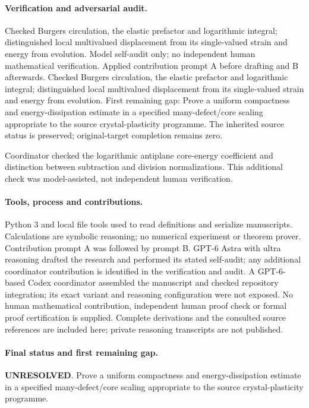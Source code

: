 \documentclass[11pt]{article}
\begin{document}
\paragraph{Verification and adversarial audit.}
Checked Burgers circulation, the elastic prefactor and logarithmic integral; distinguished local multivalued displacement from its single-valued strain and energy from evolution. Model self-audit only; no independent human mathematical verification. Applied contribution prompt A before drafting and B afterwards. Checked Burgers circulation, the elastic prefactor and logarithmic integral; distinguished local multivalued displacement from its single-valued strain and energy from evolution. First remaining gap: Prove a uniform compactness and energy-dissipation estimate in a specified many-defect/core scaling appropriate to the source crystal-plasticity programme. The inherited source status is preserved; original-target completion remains zero.

Coordinator checked the logarithmic antiplane core-energy coefficient and distinction between subtraction and division normalizations. This additional check was model-assisted, not independent human verification.

\paragraph{Tools, process and contributions.}
Python 3 and local file tools used to read definitions and serialize manuscripts. Calculations are symbolic reasoning; no numerical experiment or theorem prover. Contribution prompt A was followed by prompt B. GPT-6 Astra with ultra reasoning drafted the research and performed its stated self-audit; any additional coordinator contribution is identified in the verification and audit. A GPT-6-based Codex coordinator assembled the manuscript and checked repository integration; its exact variant and reasoning configuration were not exposed. No human mathematical contribution, independent human proof check or formal proof certification is supplied. Complete derivations and the consulted source references are included here; private reasoning transcripts are not published.

\paragraph{Final status and first remaining gap.}
\textbf{UNRESOLVED}. Prove a uniform compactness and energy-dissipation estimate in a specified many-defect/core scaling appropriate to the source crystal-plasticity programme.
\end{document}
